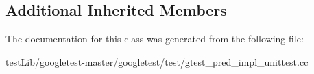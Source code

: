 \subsection*{Additional Inherited Members}


The documentation for this class was generated from the following file\+:\begin{DoxyCompactItemize}
\item 
test\+Lib/googletest-\/master/googletest/test/gtest\+\_\+pred\+\_\+impl\+\_\+unittest.\+cc\end{DoxyCompactItemize}
